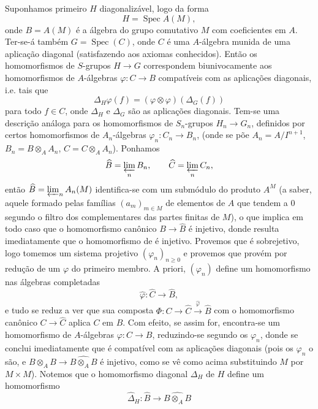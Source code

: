 Suponhamos primeiro \(H\) diagonalizável, logo da forma
\[
  H=\operatorname{Spec}A(M),
\]
onde \(B=A(M)\) é a álgebra do grupo comutativo \(M\)
com coeficientes em \(A\). Ter-se-á também
\(G=\operatorname{Spec}(C)\), onde \(C\) é uma
\(A\)-álgebra munida de uma aplicação diagonal
(satisfazendo aos axiomas conhecidos). Então os
homomorfismos de \(S\)-grupos \(H\to G\) correspondem
biunivocamente aos homomorfismos de \(A\)-álgebras
\(\varphi:C\to B\) compatíveis com as aplicações
diagonais, i.e. tais que
\[
  \Delta_H\varphi(f)=(\varphi\otimes\varphi)(\Delta_G(f))
\]
para todo \(f\in C\), onde \(\Delta_H\) e \(\Delta_G\)
são as aplicações diagonais. Tem-se uma descrição
análoga para os homomorfismos de \(S_n\)-grupos
\(H_n\to G_n\), definidos por certos homomorfismos de
\(A_n\)-álgebras \(\varphi_n:C_n\to B_n\), (onde se põe
\(A_n=A/I^{n+1}\), \(B_n=B\otimes_AA_n\),
\(C=C\otimes_AA_n\)). Ponhamos
\[
  \widehat B=\varprojlim_nB_n,\qquad
  \widehat C=\varprojlim_nC_n,
\]
então \(\widehat B=\varprojlim_nA_n(M)\) identifica-se
com um submódulo do produto \(A^M\) (a saber, aquele
formado pelas famílias \((a_m)_{m\in M}\) de elementos
de \(A\) que tendem a 0 segundo o filtro dos
complementares das partes finitas de \(M\)), o que
implica em todo caso que o homomorfismo canônico
\(B\to\widehat B\) é injetivo, donde resulta imediatamente
que o homomorfismo
 de
 é injetivo.
%
Provemos que é sobrejetivo, logo tomemos um sistema
projetivo \((\varphi_n)_{n\geq0}\) e provemos que provém
por redução de um \(\varphi\) do primeiro membro.
A priori, \((\varphi_n)\) define um homomorfismo nas
álgebras completadas
\[
  \widehat\varphi:\widehat C\to\widehat B,
\]
e tudo se reduz a ver que sua composta
\(\Phi:C\to\widehat C\xrightarrow{\widehat\varphi}\widehat B\)
com o homomorfismo
canônico \(C\to\widehat C\) aplica \(C\) em \(B\).
Com efeito, se assim for, encontra-se um homomorfismo de
\(A\)-álgebras %
\(\varphi:C\to B\), reduzindo-se segundo os
\(\varphi_n\), donde se conclui imediatamente que é
compatível com as aplicações diagonais (pois os
\(\varphi_n\) o são, e
\(B\otimes_AB\to\widehat{B\otimes_AB}\) é injetivo, como
se vê como acima substituindo \(M\) por \(M\times M\)).
Notemos que o homomorfismo diagonal \(\Delta_H\) de
\(H\) define um homomorfismo
\[
  \widehat\Delta_H:\widehat B\to\widehat{B\otimes_AB}
\]
